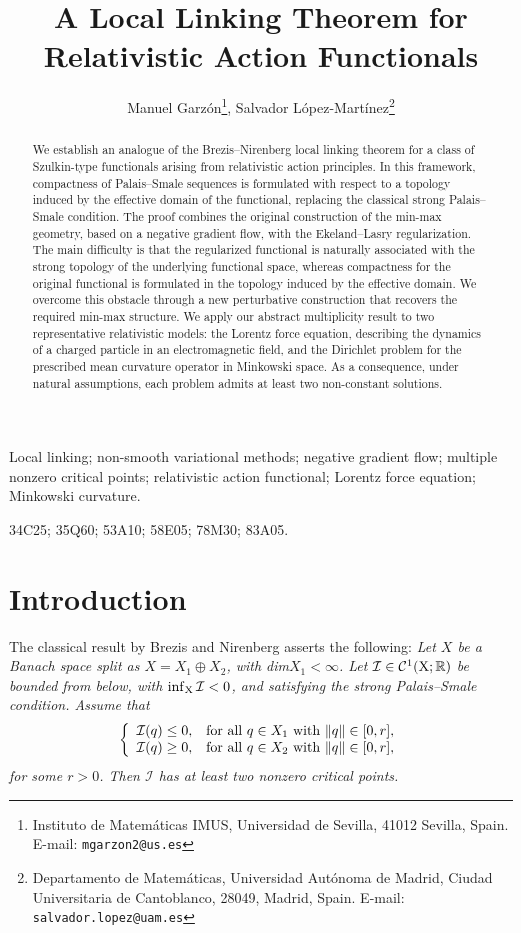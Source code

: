 \documentclass{article}
\title{A Local Linking Theorem for
Relativistic Action Functionals}
\author{ Manuel Garz\'on\footnote{Instituto de Matemáticas IMUS, Universidad de Sevilla, 41012 Sevilla, Spain. E-mail: {\tt mgarzon2@us.es}}, Salvador L\'opez-Mart\'inez\footnote{Departamento de Matem\'aticas, Universidad Aut\'onoma de Madrid, Ciudad Universitaria de Cantoblanco, 28049, Madrid, Spain. 
		E-mail: {\tt salvador.lopez@uam.es}}}
\date{}
\newcommand{\boI}{\mathcal{I}}
\newcommand{\R}{\mathbb{R}}
\theoremstyle{definition}
\begin{document}
	
	\maketitle

	
	\begin{abstract}
We establish an analogue of the Brezis--Nirenberg local linking theorem for a class of Szulkin-type functionals arising from relativistic action principles. In this framework, compactness of Palais--Smale sequences is formulated with respect to a topology induced by the effective domain of the functional, replacing the classical strong Palais--Smale condition. The proof combines the original construction of the min-max geometry, based on a negative gradient flow, with the Ekeland--Lasry regularization. The main difficulty is that the regularized functional is naturally associated with the strong topology of the underlying functional space, whereas compactness for the original functional is formulated in the topology induced by the effective domain. We overcome this obstacle through a new perturbative construction that recovers the required min-max structure. We apply our abstract multiplicity result to two representative relativistic models: the Lorentz force equation, describing the dynamics of a charged particle in an electromagnetic field, and the Dirichlet problem for the prescribed mean curvature operator in Minkowski space. As a consequence, under natural assumptions, each problem admits at least two non-constant solutions.
\end{abstract}
	Local linking; non-smooth variational methods; negative gradient flow; multiple nonzero critical points; relativistic action functional; Lorentz force equation; Minkowski curvature.

34C25; %
35Q60; %
53A10; %
58E05; %
78M30; %
83A05. %
\section{Introduction}
The classical result \cite[Theorem 4]{Bre-Nir}  by Brezis and Nirenberg asserts the following: \textsl{Let $X$ be a Banach space split as $X=X_1\oplus X_2$, with dim$X_1<\infty$. Let $\boI\in\mathcal C^1(\textnormal{X};\R)$ be bounded from below, with $\inf_{\textnormal{X}}\boI<0$, and satisfying the strong Palais--Smale condition. Assume that
\begin{equation}
\label{hyp:SplittingBrezis}
\left\{\begin{array}{ll}
\boI(q)\leq0,&\hbox{for all }q\in X_1\ \hbox{with }\|q\|\in[0,r],\\
\boI(q)\geq 0,&\hbox{for all }q\in X_2\ \hbox{with }\|q\|\in[0,r],
\end{array}\right.
\end{equation}
for some $r>0$. Then $\boI$ has at least two nonzero critical points.}
\end{document}
